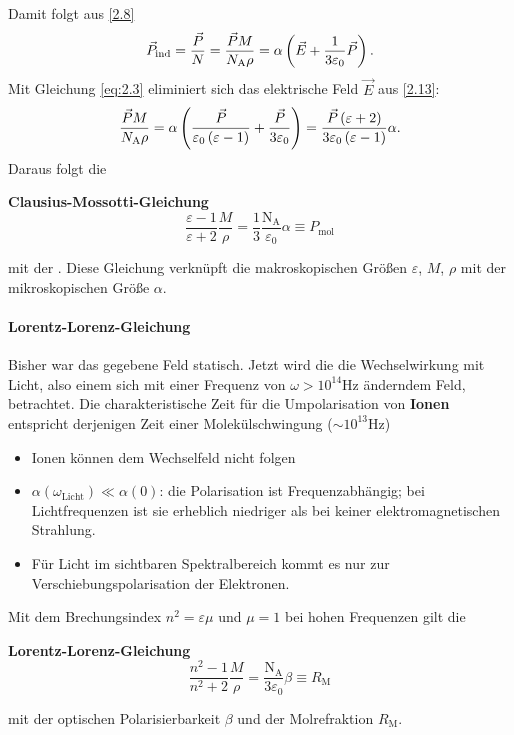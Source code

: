     Damit folgt aus \ref{2.8}
    \begin{equation}
    	\label{2.13}
    	\vec{P}_{\text{ind}} = \frac{\vec{P}}{N} = \frac{\vec{P} M}{N_\mathrm{A} \rho} = \alpha \left( \vec{E} + \frac{1}{3 \varepsilon_0} \vec{P} \right) .
    \end{equation} 
    Mit Gleichung \eqref{eq:2.3} eliminiert sich das elektrische Feld $ \vec{E}$ aus \ref{2.13}:
    $$
    \frac{\vec{P} M}{N_\mathrm{A} \rho} = \alpha \left( \frac{\vec{P}}{ \varepsilon_0 \left( \varepsilon -1 \right) } + \frac{\vec{P}}{3 \varepsilon_0} \right)  = \frac{\vec{P} \left( \varepsilon +2 \right) }{3 \varepsilon_0 \left( \varepsilon-1 \right) } \alpha.
    $$
    Daraus folgt die 
    \begin{important}
        \textbf{Clausius-Mossotti-Gleichung}\\
        \begin{equation}
            { \frac{ \varepsilon -1}{ \varepsilon +2} \frac{M}{ \rho} = \frac{1}{3} \frac{\text{N}_{\text{A}}}{ \varepsilon_0} \alpha \equiv P_{\text{mol}}}
            \label{eq:clausius_mossotti}
        \end{equation}
    \end{important}
    mit der . Diese Gleichung verknüpft die makroskopischen Größen $ \varepsilon$, $ M$, $ \rho$ mit der mikroskopischen Größe $ \alpha$.

\paragraph{Lorentz-Lorenz-Gleichung}
    Bisher war das gegebene Feld statisch. Jetzt wird die die Wechselwirkung mit Licht, also einem sich mit einer Frequenz von $ \omega > \si{10^{14} \hertz}$ änderndem Feld, betrachtet. Die charakteristische Zeit für die Umpolarisation von \textbf{Ionen} entspricht derjenigen Zeit einer Molekülschwingung ($\sim \si{10^{13}\hertz}$)
    \begin{itemize}[label= $\to$]
    	\item Ionen können dem Wechselfeld nicht folgen
    	\item $ \alpha \left( \omega_{\text{Licht}} \right) \ll \alpha \left( 0 \right)$: die Polarisation ist Frequenzabhängig; bei Lichtfrequenzen ist sie erheblich niedriger als bei keiner elektromagnetischen Strahlung.
    	\item Für Licht im sichtbaren Spektralbereich kommt es nur zur Verschiebungspolarisation der Elektronen.
    \end{itemize}
    Mit dem Brechungsindex $n^2 = \varepsilon \mu$ und $ \mu = 1$ bei hohen Frequenzen gilt die 
    \begin{important}
        \textbf{Lorentz-Lorenz-Gleichung}\\
        \begin{equation}
            {\frac{n^2 -1}{n^2 +2} \frac{M}{ \rho} = \frac{\text{N}_{\text{A}}}{3 \varepsilon_0} \beta \equiv R_{\text{M}}}
        \end{equation}
    \end{important}
    mit der optischen Polarisierbarkeit $\beta$ und der Molrefraktion $R_{\text{M}}$.


